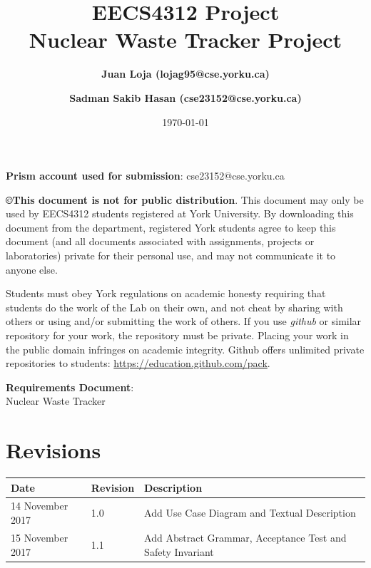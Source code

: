 \documentclass[fontsize=12pt,paper=letter,twoside]{scrartcl}
\author{\textbf{Juan Loja (lojag95@cse.yorku.ca)}
\and \textbf{Sadman Sakib Hasan (cse23152@cse.yorku.ca)}
}
\date{\today} %
\begin{document}
\title{EECS4312 Project\\Nuclear Waste Tracker Project}
\maketitle

\noindent \textbf{Prism account used for submission}: cse23152@cse.yorku.ca

\begin {mdframed}
\textbf{\copyright This document is not for public distribution}. This document may only be used by EECS4312 students registered at York University. By downloading this document from the department, registered York students agree to keep this document (and all documents associated with assignments, projects or laboratories) private for their personal use, and may not communicate it to anyone else. 

Students must obey York regulations on academic honesty requiring that students do the work of the Lab on their own, and not cheat by sharing with others or using and/or submitting the work of others. If you use \textit{github} or similar repository for your work,  the repository must be private. Placing your work in the public domain infringes on academic integrity. Github offers unlimited private repositories to students: \url{https://education.github.com/pack}.

\end {mdframed}

\newpage

\vspace*{2in}
\begin{center}
\huge{\textbf{Requirements Document}:\\ Nuclear Waste Tracker}
\end{center}

\bigskip\bigskip

\section*{Revisions}

\begin{tabular}{|l|l|p{3in}|}
\hline
Date & Revision & Description \\ 
\hline
14 November  2017
& 1.0
& Add Use Case Diagram and Textual Description\\ 
\hline
15 November  2017
& 1.1
& Add Abstract Grammar, Acceptance Test and Safety Invariant\\ 
\hline
\end{tabular}
\end{document}
